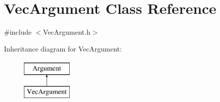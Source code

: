 \hypertarget{classVecArgument}{\section{Vec\-Argument Class Reference}
\label{classVecArgument}
}


{\ttfamily \#include $<$Vec\-Argument.\-h$>$}

Inheritance diagram for Vec\-Argument\-:\begin{figure}[H]
\begin{center}
\leavevmode
\includegraphics[height=2.000000cm]{classVecArgument}
\end{center}
\end{figure}
